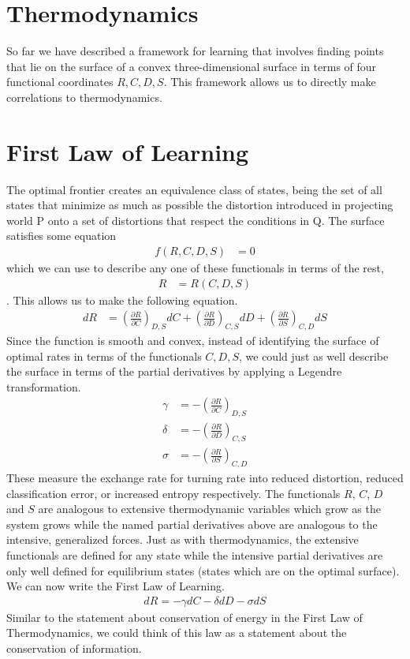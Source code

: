 \documentclass[book.tex]{subfiles}
\begin{document}
\section{Thermodynamics}
So far we have described a framework for learning that involves finding points that lie on the surface of a convex three-dimensional surface in terms of four functional coordinates $R, C, D, S$. This framework allows us to directly make correlations to thermodynamics.

\section{First Law of Learning}
The optimal frontier creates an equivalence class of states, being the set of all states that minimize as much as possible the distortion introduced in projecting world P onto a set of distortions that respect the conditions in Q. The surface satisfies some equation 
\begin{align}
f(R,C,D,S) &=0
\end{align}
which we can use to describe any one of these functionals in terms of the rest, 
\begin{align}
R &=R(C,D,S)
\end{align}. This allows us to make the following equation.
\begin{align}
dR &=\left (\frac{\partial R}{\partial C}\right)_{D,S}dC+\left (\frac{\partial R}{\partial D}\right)_{C,S}dD+\left (\frac{\partial R}{\partial S}\right)_{C,D}dS
\end{align}
Since the function is smooth and convex, instead of identifying the surface of optimal rates in terms of the functionals $C, D, S$, we could just as well describe the surface in terms of the partial derivatives by applying a Legendre transformation.
\begin{align}
\gamma &=-\left(\frac{\partial R}{\partial C}\right)_{D,S}\\ 
\delta&=-\left(\frac{\partial R}{\partial D}\right)_{C,S}\\
\sigma&=-\left(\frac{\partial R}{\partial S}\right)_{C,D}
\end{align}
These measure the exchange rate for turning rate into reduced distortion, reduced classification error, or increased entropy respectively. The functionals $R$, $C$, $D$ and $S$ are analogous to extensive thermodynamic variables which grow as the system grows while the named partial derivatives above are analogous to the intensive, generalized forces. Just as with thermodynamics, the extensive functionals are defined for any state while the intensive partial derivatives are only well defined for equilibrium states (states which are on the optimal surface). We can now write the First Law of Learning.
\begin{align}
dR=-\gamma dC-\delta dD -\sigma dS
\end{align}
Similar to the statement about conservation of energy in the First Law of Thermodynamics, we could think of this law as a statement about the conservation of information.
\end{document}
